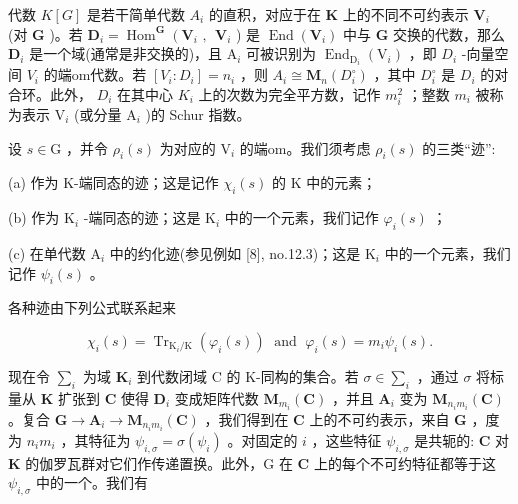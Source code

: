 \documentclass[10pt]{article}
\begin{document}
代数 \(K\left\lbrack  G\right\rbrack\) 是若干简单代数 \({A}_{i}\) 的直积，对应于在 \(\mathbf{K}\) 上的不同不可约表示 \({\mathbf{V}}_{i}\) (对 \(\mathbf{G}\) )。若 \({\mathbf{D}}_{i} = {\operatorname{Hom}}^{\mathbf{G}}\left( {{\mathbf{V}}_{i}\text{ , }}\right. \; {\mathbf{V}}_{i}\) ) 是 \(\operatorname{End}\left( {\mathbf{V}}_{i}\right)\) 中与 \(\mathbf{G}\) 交换的代数，那么 \({\mathbf{D}}_{i}\) 是一个域(通常是非交换的)，且 \({\mathrm{A}}_{i}\) 可被识别为 \({\operatorname{End}}_{{\mathrm{D}}_{i}}\left( {\mathrm{V}}_{i}\right)\) ，即 \({D}_{i}\) -向量空间 \({V}_{i}\) 的端om代数。若 \(\left\lbrack  {{V}_{i} : {D}_{i}}\right\rbrack   = {n}_{i}\) ，则 \({A}_{i} \cong  {\mathbf{M}}_{n}\left( {D}_{i}^{ \circ  }\right)\) ，其中 \({D}_{i}^{ \circ  }\) 是 \({D}_{i}\) 的对合环。此外， \({D}_{i}\) 在其中心 \({K}_{i}\) 上的次数为完全平方数，记作 \({m}_{i}^{2}\) ；整数 \({m}_{i}\) 被称为表示 \({\mathrm{V}}_{i}\) (或分量 \({\mathrm{A}}_{i}\) )的 Schur 指数。

设 \(s \in  \mathrm{G}\) ，并令 \({\rho }_{i}\left( s\right)\) 为对应的 \({\mathrm{V}}_{i}\) 的端om。我们须考虑 \({\rho }_{i}\left( s\right)\) 的三类“迹”:

(a) 作为 K-端同态的迹；这是记作 \({\chi }_{i}\left( s\right)\) 的 K 中的元素；

(b) 作为 \({\mathrm{K}}_{i}\) -端同态的迹；这是 \({\mathrm{K}}_{i}\) 中的一个元素，我们记作 \({\varphi }_{i}\left( s\right)\) ；

(c) 在单代数 \({\mathrm{A}}_{i}\) 中的约化迹(参见例如 [8], no.12.3)；这是 \({\mathrm{K}}_{i}\) 中的一个元素，我们记作 \({\psi }_{i}\left( s\right)\) 。

各种迹由下列公式联系起来

\[
{\chi }_{i}\left( s\right)  = {\operatorname{Tr}}_{{\mathrm{K}}_{i}/\mathrm{K}}\left( {{\varphi }_{i}\left( s\right) }\right) \;\text{ and }\;{\varphi }_{i}\left( s\right)  = {m}_{i}{\psi }_{i}\left( s\right) .
\]

现在令 \({\sum }_{i}\) 为域 \({\mathbf{K}}_{i}\) 到代数闭域 C 的 K-同构的集合。若 \(\sigma  \in  {\sum }_{i}\) ，通过 \(\sigma\) 将标量从 \(\mathbf{K}\) 扩张到 \(\mathbf{C}\) 使得 \({\mathbf{D}}_{i}\) 变成矩阵代数 \({\mathbf{M}}_{{m}_{i}}\left( \mathbf{C}\right)\) ，并且 \({\mathbf{A}}_{i}\) 变为 \({\mathbf{M}}_{{n}_{i}{m}_{i}}\left( \mathbf{C}\right)\) 。复合 \(\mathbf{G} \rightarrow  {\mathbf{A}}_{i} \rightarrow  {\mathbf{M}}_{{n}_{i}{m}_{i}}\left( \mathbf{C}\right)\) ，我们得到在 \(\mathbf{C}\) 上的不可约表示，来自 \(\mathbf{G}\) ，度为 \({n}_{i}{m}_{i}\) ，其特征为 \({\psi }_{i,\sigma } = \sigma \left( {\psi }_{i}\right)\) 。对固定的 \(i\) ，这些特征 \({\psi }_{i,\sigma }\) 是共轭的: \(\mathbf{C}\) 对 \(\mathbf{K}\) 的伽罗瓦群对它们作传递置换。此外，G 在 \(\mathbf{C}\) 上的每个不可约特征都等于这 \({\psi }_{i,\sigma }\) 中的一个。我们有
\end{document}
